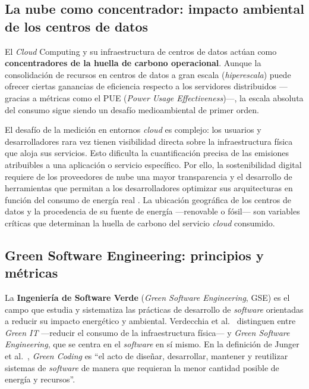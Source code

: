 \subsection{La nube como concentrador: impacto ambiental de los centros de datos}


El \textit{Cloud} Computing y su infraestructura de centros de datos actúan como \textbf{concentradores de la huella de carbono operacional}. Aunque la consolidación de recursos en centros de datos a gran escala (\textit{hiperescala}) puede ofrecer ciertas ganancias de eficiencia respecto a los servidores distribuidos —gracias a métricas como el PUE (\textit{Power Usage Effectiveness})—, la escala absoluta del consumo sigue siendo un desafío medioambiental de primer orden.


El desafío de la medición en entornos \textit{cloud} es complejo: los usuarios y desarrolladores rara vez tienen visibilidad directa sobre la infraestructura física que aloja sus servicios. Esto dificulta la cuantificación precisa de las emisiones atribuibles a una aplicación o servicio específico. Por ello, la sostenibilidad digital requiere de los proveedores de nube una mayor transparencia y el desarrollo de herramientas que permitan a los desarrolladores optimizar sus arquitecturas en función del consumo de energía real \cite{verdecchia2021green}. La ubicación geográfica de los centros de datos y la procedencia de su fuente de energía —renovable o fósil— son variables críticas que determinan la huella de carbono del servicio \textit{cloud} consumido.


\subsection{Green Software Engineering: principios y métricas}


La \textbf{Ingeniería de Software Verde} (\textit{Green Software Engineering}, GSE) es el campo que estudia y sistematiza las prácticas de desarrollo de \textit{software} orientadas a reducir su impacto energético y ambiental. Verdecchia et al.~\cite{verdecchia2021green} distinguen entre \textit{Green IT} —reducir el consumo de la infraestructura física— y \textit{Green Software Engineering}, que se centra en el \textit{software} en sí mismo. En la definición de Junger et al.~\cite{junger2024potentials}, \textit{Green Coding} es ``el acto de diseñar, desarrollar, mantener y reutilizar sistemas de \textit{software} de manera que requieran la menor cantidad posible de energía y recursos''.


